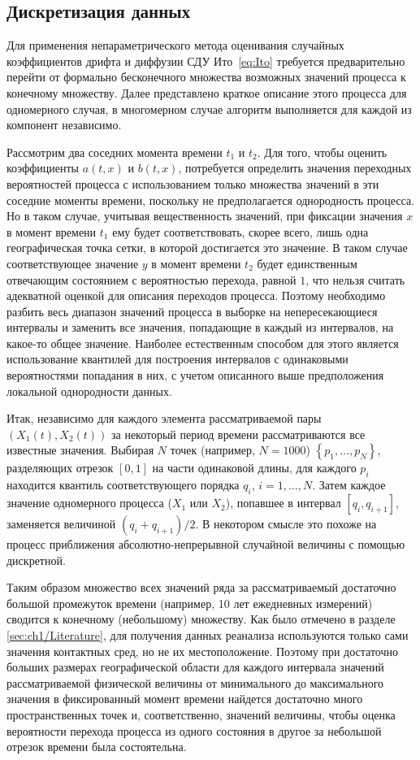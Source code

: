 \subsection{Дискретизация данных}
\label{sec:Discretization}
Для применения непараметрического метода оценивания случайных коэффициентов дрифта и диффузии СДУ Ито~\eqref{eq:Ito} требуется предварительно перейти от формально бесконечного множества возможных значений процесса к конечному множеству. Далее представлено краткое описание этого процесса для одномерного случая, в многомерном случае алгоритм выполняется для каждой из компонент независимо.

Рассмотрим два соседних момента времени $t_1$ и $t_2$. Для того, чтобы оценить коэффициенты $a(t,x)$ и $b(t,x)$, потребуется определить значения переходных вероятностей процесса с использованием только множества значений в эти соседние моменты времени, поскольку не предполагается однородность процесса. Но в таком случае, учитывая вещественность значений, при фиксации значения $x$ в момент времени $t_1$ ему будет соответствовать, скорее всего, лишь одна географическая точка сетки, в которой достигается это значение. В таком случае соответствующее значение $y$ в момент времени $t_2$ будет единственным отвечающим состоянием с вероятностью перехода, равной $1$, что нельзя считать адекватной оценкой для описания переходов процесса. Поэтому необходимо разбить весь диапазон значений процесса в выборке на непересекающиеся интервалы и заменить все значения, попадающие в каждый из интервалов, на какое-то общее значение. Наиболее естественным способом для этого является использование квантилей для построения интервалов с одинаковыми вероятностями попадания в них, с учетом описанного выше предположения локальной однородности данных.

Итак, независимо для каждого элемента рассматриваемой пары $(X_1(t), X_2(t))$ за некоторый период времени рассматриваются все известные значения. Выбирая $N$ точек (например, $N=1000$) $\left\lbrace p_1, \ldots, p_{N} \right\rbrace $, разделяющих  отрезок $[0, 1]$ на части одинаковой длины, для каждого $p_i$ находится квантиль соответствующего порядка $q_i$, $i=1, \ldots, N$. Затем каждое значение одномерного процесса ($X_1$ или $X_2$), попавшее в интервал $[q_i, q_{i+1}]$, заменяется величиной $(q_i + q_{i+1})/2$. В некотором смысле это похоже на процесс приближения абсолютно-непрерывной случайной величины с помощью дискретной.

Таким образом множество всех значений ряда за рассматриваемый достаточно большой промежуток времени (например, 10 лет ежедневных измерений) сводится к конечному (небольшому) множеству. Как было отмечено в разделе \ref{sec:ch1/Literature}, для получения данных реанализа используются только сами значения контактных сред, но не их местоположение. Поэтому при достаточно больших размерах географической области для каждого интервала значений рассматриваемой физической величины от минимального до максимального значения в фиксированный момент времени найдется достаточно много пространственных точек и, соответственно, значений величины, чтобы оценка вероятности перехода процесса из одного состояния в другое за небольшой отрезок времени была состоятельна. 

